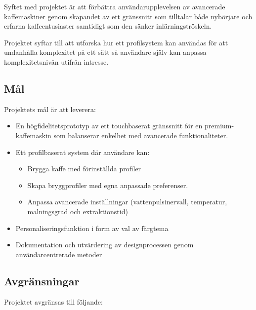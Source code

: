 Syftet med projektet är att förbättra användarupplevelsen av avancerade kaffemaskiner genom skapandet av ett gränssnitt som tilltalar både nybörjare och erfarna kaffeentusiaster samtidigt som den sänker inlärningströskeln.  

Projektet syftar till att utforska hur ett profilsystem kan användas för att undanhålla komplexitet på ett sätt så användare själv kan anpassa komplexitetsnivån utifrån intresse.

\subsection{Mål}

Projektets mål är att leverera:

\begin{itemize}
    \item En högfidelitetsprototyp av ett touchbaserat gränssnitt för en premium-kaffemaskin som balanserar enkelhet med avancerade funktionaliteter.
    \item Ett profilbaserat system där användare kan:
    \begin{itemize}
        \item Brygga kaffe med förinställda profiler
        \item Skapa bryggprofiler med egna anpassade preferenser. 
        \item Anpassa avancerade inställningar (vattenpulsinervall, temperatur, malningsgrad och extraktionstid)
    \end{itemize}

    \item Personaliseringsfunktion i form av val av färgtema

    \item Dokumentation och utvärdering av designprocessen genom användarcentrerade metoder
    
\end{itemize}


\subsection{Avgränsningar}

Projektet avgränsas till följande:


